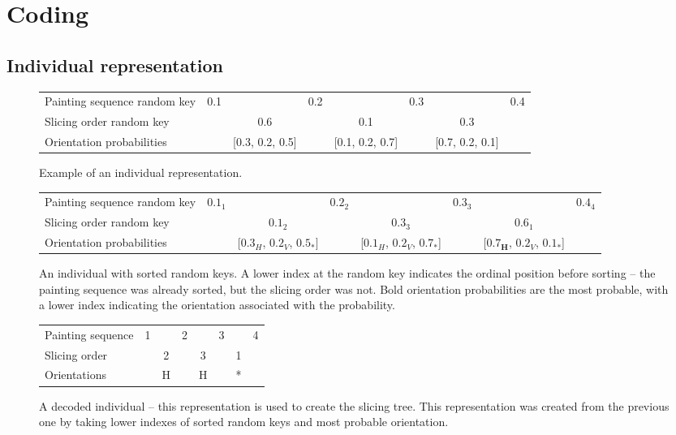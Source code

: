 \chapter{Coding}\label{ch:coding}


\section{Individual representation}\label{subsec:individual-representation}

\begin{figure}[htp]

    \begin{tabular}{lccccccc}
        Painting sequence random key & 0.1 &                     & 0.2 &                     & 0.3 &                     & 0.4 \\
        Slicing order random key     &     & 0.6                 &     & 0.1                 &     & 0.3                 &     \\
        Orientation probabilities    &     & {[}0.3, 0.2, 0.5{]} &     & {[}0.1, 0.2, 0.7{]} &     & {[}0.7, 0.2, 0.1{]} &
    \end{tabular}
    \caption{Example of an individual representation.}
    \label{tab:ind-rep-example}

    \bigskip

    \begin{tabular}{lccccccc}
        Painting sequence random key & $0.1_1$ &                                      & $0.2_2$ &                                      & $0.3_3$ &                                      & $0.4_4$ \\
        Slicing order random key     &         & $0.1_2$                              &         & $0.3_3$                              &         & $0.6_1$                              &         \\
        Orientation probabilities    &         & [$0.3_H$, $0.2_V$, $\mathbf{0.5_*]}$ &         & [$0.1_H$, $0.2_V$, $\mathbf{0.7_*}$] &         & [$\mathbf{0.7_H}$, $0.2_V$, $0.1_*$] &
    \end{tabular}
    \caption{An individual with sorted random keys. A lower index at the random key indicates the ordinal position before sorting – the painting sequence was already sorted, but the slicing order was not. Bold orientation probabilities are the most probable, with a lower index indicating the orientation associated with the probability.}
    \label{tab:ind-rep-sorted}

    \bigskip

    \begin{tabular}{lccccccc}
        Painting sequence & 1 &   & 2 &   & 3 &   & 4 \\
        Slicing order     &   & 2 &   & 3 &   & 1 &   \\
        Orientations      &   & H &   & H &   & * &
    \end{tabular}
    \caption{A decoded individual – this representation is used to create the slicing tree. This representation was created from the previous one by taking lower indexes of sorted random keys and most probable orientation.}
    \label{tab:ind-decoded}

\end{figure}
